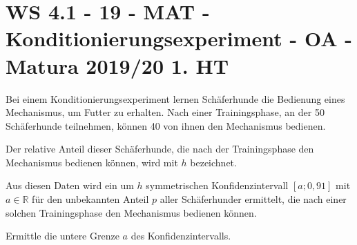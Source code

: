 \section{WS 4.1 - 19 - MAT - Konditionierungsexperiment - OA - Matura 2019/20 1. HT}

\begin{beispiel}[WS 4.1]{1}
Bei einem Konditionierungsexperiment lernen Schäferhunde die Bedienung eines Mechanismus, um Futter zu erhalten. Nach einer Trainingsphase, an der 50 Schäferhunde teilnehmen, können 40 von ihnen den Mechanismus bedienen.

Der relative Anteil dieser Schäferhunde, die nach der Trainingsphase den Mechanismus bedienen können, wird mit $h$ bezeichnet.

Aus diesen Daten wird ein um $h$ symmetrischen Konfidenzintervall $[a;0,91]$ mit $a\in\mathbb{R}$ für den unbekannten Anteil $p$ aller Schäferhunder ermittelt, die nach einer solchen Trainingsphase den Mechanismus bedienen können.

Ermittle die untere Grenze $a$ des Konfidenzintervalls.

\end{beispiel}